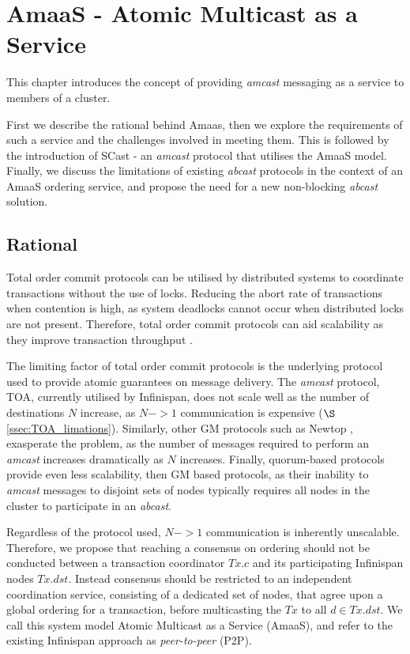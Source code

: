 \chapter{AmaaS - Atomic Multicast as a Service}

    \graphicspath{{Chapter3-TxService/Figs/Vector/}{Chapter3-TxService/Figs/}}

This chapter introduces the concept of providing \emph{amcast} messaging as a service to members of a cluster.

First we describe the rational behind \textsf{Amaas}, then we explore the requirements of such a service and the challenges involved in meeting them.  This is followed by the introduction of \textsf{SCast} - an \emph{amcast} protocol that utilises the \textsf{AmaaS} model.  Finally, we discuss the limitations of existing \emph{abcast} protocols in the context of an \textsf{AmaaS} ordering service, and propose the need for a new non-blocking \emph{abcast} solution.  

\section{Rational}
Total order commit protocols can be utilised by distributed systems to coordinate transactions without the use of locks.  Reducing the abort rate of transactions when contention is high, as system deadlocks cannot occur when distributed locks are not present.  Therefore, total order commit protocols can aid scalability as they improve transaction throughput \citep{Ruivo:2011:ETO:2120967.2121604}.  

The limiting factor of total order commit protocols is the underlying protocol used to provide atomic guarantees on message delivery.  The \emph{amcast} protocol, TOA, currently utilised by Infinispan, does not scale well as the number of destinations $N$ increase, as $N->1$ communication is expensive ($\S$ \ref{ssec:TOA_limations}).  Similarly, other GM protocols such as Newtop \citep{Ezhilchelvan:1995:NFG:876885.880005}, exasperate the problem, as the number of messages required to perform an \emph{amcast} increases dramatically as $N$ increases.  Finally, quorum-based protocols provide even less scalability, then GM based protocols, as their inability to \emph{amcast} messages to disjoint sets of nodes typically requires all nodes in the cluster to participate in an \emph{abcast}.  

Regardless of the protocol used, $N->1$ communication is inherently unscalable.  Therefore, we propose that reaching a consensus on ordering should not be conducted between a transaction coordinator $Tx.c$ and its participating Infinispan nodes $Tx.dst$.  Instead consensus should be restricted to an independent coordination service, consisting of a dedicated set of nodes, that agree upon a global ordering for a transaction, before multicasting the $Tx$ to all $d \in Tx.dst$.  We call this system model Atomic Multicast as a Service (\textsf{AmaaS}), and refer to the existing Infinispan approach as \emph{peer-to-peer} (P2P).  

